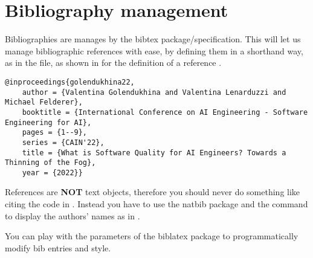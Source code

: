 

\section{Bibliography management}
\label{sec:biblio}

Bibliographies are manages by the bibtex package/specification. This will let us manage bibliographic references with ease, by defining them in a shorthand way, as in the  file, as shown in  for the definition of a reference \cite{golendukhina22}.

\begin{lstlisting}[frame=lines, 
   label={lst:bib}, 
  caption={Bib entry example}]
@inproceedings{golendukhina22,
	author = {Valentina Golendukhina and Valentina Lenarduzzi and Michael Felderer},
	booktitle = {International Conference on AI Engineering - Software Engineering for AI},
	pages = {1--9},
	series = {CAIN'22},
	title = {What is Software Quality for AI Engineers? Towards a Thinning of the Fog},
	year = {2022}}
\end{lstlisting}

References are \textbf{NOT} text objects, therefore you should never do something like citing the code in \cite{islam20}. Instead you have to use the natbib package and the  command to display the authors' names as in \citet{islam20}.

You can play with the parameters of the biblatex package to programmatically modify bib entries and style.

\endinput